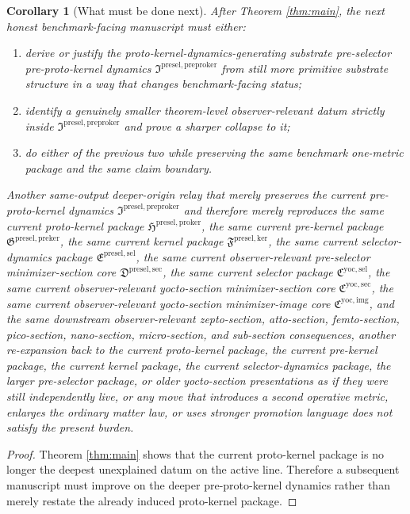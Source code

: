 \documentclass[11pt]{article}
\newcommand{\YoctoImageCore}{\mathfrak C^{\mathrm{yoc,img}}}
\newcommand{\YoctoMinSectionCore}{\mathfrak C^{\mathrm{yoc,sec}}}
\newcommand{\YoctoSelectorPackage}{\mathfrak C^{\mathrm{yoc,sel}}}
\newcommand{\PreSelectorMinSectionCore}{\mathfrak D^{\mathrm{presel,sec}}}
\newcommand{\PreSectionSelectorPackage}{\mathfrak E^{\mathrm{presel,sel}}}
\newcommand{\KernelPackage}{\mathfrak F^{\mathrm{presel,ker}}}
\newcommand{\PreKernelPackage}{\mathfrak G^{\mathrm{presel,preker}}}
\newcommand{\ProtoKernelPackage}{\mathfrak H^{\mathrm{presel,proker}}}
\newcommand{\PreProtoKernelPackage}{\mathfrak I^{\mathrm{presel,preproker}}}
\newtheorem{corollary}{Corollary}
\begin{document}
\begin{corollary}[What must be done next]
\label{cor:next}
After Theorem \ref{thm:main}, the next honest benchmark-facing manuscript must either:
\begin{enumerate}
    \item derive or justify the proto-kernel-dynamics-generating substrate pre-selector pre-proto-kernel dynamics \(\PreProtoKernelPackage\) from still more primitive substrate structure in a way that changes benchmark-facing status;
    \item identify a genuinely smaller theorem-level observer-relevant datum strictly inside \(\PreProtoKernelPackage\) and prove a sharper collapse to it;
    \item do either of the previous two while preserving the same benchmark one-metric package and the same claim boundary.
\end{enumerate}
Another same-output deeper-origin relay that merely preserves the current pre-proto-kernel dynamics \(\PreProtoKernelPackage\) and therefore merely reproduces the same current proto-kernel package \(\ProtoKernelPackage\), the same current pre-kernel package \(\PreKernelPackage\), the same current kernel package \(\KernelPackage\), the same current selector-dynamics package \(\PreSectionSelectorPackage\), the same current observer-relevant pre-selector minimizer-section core \(\PreSelectorMinSectionCore\), the same current selector package \(\YoctoSelectorPackage\), the same current observer-relevant yocto-section minimizer-section core \(\YoctoMinSectionCore\), the same current observer-relevant yocto-section minimizer-image core \(\YoctoImageCore\), and the same downstream observer-relevant zepto-section, atto-section, femto-section, pico-section, nano-section, micro-section, and sub-section consequences, another re-expansion back to the current proto-kernel package, the current pre-kernel package, the current kernel package, the current selector-dynamics package, the larger pre-selector package, or older yocto-section presentations as if they were still independently live, or any move that introduces a second operative metric, enlarges the ordinary matter law, or uses stronger promotion language does not satisfy the present burden.
\end{corollary}

\begin{proof}
Theorem \ref{thm:main} shows that the current proto-kernel package is no longer the deepest unexplained datum on the active line. Therefore a subsequent manuscript must improve on the deeper pre-proto-kernel dynamics rather than merely restate the already induced proto-kernel package.
\end{proof}
\end{document}
